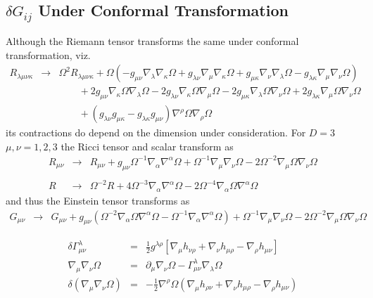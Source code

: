 \documentclass[10pt,letterpaper]{article}
\numberwithin{equation}{section}
\begin{document}
\begin{appendices}
\section{$\delta G_{ij}$ Under Conformal Transformation}
Although the Riemann tensor transforms the same under conformal transformation, viz.
\begin{eqnarray}
R_{\lambda\mu\nu\kappa} &\to& \Omega^2 R_{\lambda\mu\nu\kappa} + \Omega\left ( -g_{\mu\nu}\nabla_\lambda \nabla_\kappa \Omega
+ g_{\lambda\nu}\nabla_\mu\nabla_\kappa \Omega + g_{\mu\kappa} \nabla_\nu\nabla_\lambda \Omega - g_{\lambda\kappa} \nabla_\mu\nabla_\nu \Omega \right)
\nonumber\\
&&\qquad+ 2g_{\mu\nu} \nabla_\kappa\Omega \nabla_\lambda\Omega - 2g_{\lambda\nu} \nabla_\kappa\Omega \nabla_\mu\Omega - 2g_{\mu\kappa}
\nabla_\lambda\Omega \nabla_\nu\Omega + 2g_{\lambda\kappa} \nabla_\mu \Omega \nabla_\nu\Omega
\nonumber\\
&&\qquad + (g_{\lambda\nu} g_{\mu\kappa}-g_{\lambda\kappa}g_{\mu\nu})\nabla^\rho \Omega \nabla_\rho \Omega
\end{eqnarray}
its contractions do depend on the dimension under consideration. For $D=3$ $\mu,\nu = 1,2,3$ the Ricci tensor and scalar transform as
\begin{eqnarray}
R_{\mu\nu} &\to& R_{\mu \nu} + g_{\mu \nu} \Omega^{-1} \nabla_{\alpha}\nabla^{\alpha}\Omega +  \Omega^{-1} \nabla_{\mu}\nabla_{\nu}\Omega - 2 \Omega^{-2} \nabla_{\mu}\Omega \nabla_{\nu}\Omega
\nonumber\\ \nonumber\\
R &\to&  \Omega^{-2}R + 4 \Omega^{-3} \nabla_{\alpha}\nabla^{\alpha}\Omega - 2 \Omega^{-4} \nabla_{\alpha}\Omega \nabla^{\alpha}\Omega
\end{eqnarray}
and thus the Einstein tensor transforms as
\begin{eqnarray}
G_{\mu\nu} &\to& G_{\mu\nu} +  g_{\mu \nu}( \Omega^{-2} \nabla_{\alpha}\Omega \nabla^{\alpha}\Omega -\Omega^{-1} \nabla_{\alpha}\nabla^{\alpha}\Omega)+  \Omega^{-1} \nabla_{\mu}\nabla_{\nu}\Omega - 2 \Omega^{-2} \nabla_{\mu}\Omega \nabla_{\nu}\Omega
\label{gbg}
\end{eqnarray}

\begin{eqnarray}
\delta \Gamma^\lambda_{\mu\nu} &=& \tfrac12 g^{\lambda\rho}\left[ \nabla_\mu h_{\nu\rho} + \nabla_\nu h_{\mu\rho} - \nabla_\rho h_{\mu\nu} \right]
\nonumber\\
\nabla_\mu \nabla_\nu \Omega  &=& \partial_\mu \nabla_\nu \Omega  - \Gamma^\lambda_{\mu\nu} \nabla_\lambda\Omega
\nonumber\\
\delta (\nabla_\mu \nabla_\nu \Omega) &=& -\tfrac12 \nabla^\rho \Omega (\nabla_\mu h_{\rho\nu} + \nabla_\nu h_{\mu\rho} - \nabla_\rho h_{\mu\nu})
\end{eqnarray}


\end{appendices}
\end{document}
